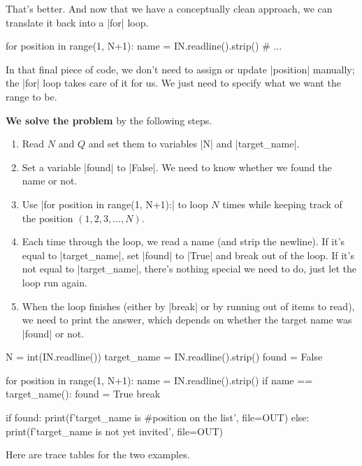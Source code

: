 That's better. And now that we have a conceptually clean approach, we can translate it
back into a \pycode|for| loop.

\begin{pythoncode}
  for position in range(1, N+1):
    name = IN.readline().strip()
    # ...
\end{pythoncode}

In that final piece of code, we don't need to assign or update \pycode|position| manually;
the \pycode|for| loop takes care of it for us. We just need to specify what we want the
range to be.

\textbf{We solve the problem} by the following steps.
\begin{enumerate}
  \item Read $N$ and $Q$ and set them to variables \pycode|N| and \pycode|target_name|.
  \item Set a variable \pycode|found| to \pycode|False|. We need to know whether we found
    the name or not.
  \item Use \pycode|for position in range(1, N+1):| to loop $N$ times while keeping track
    of the position $(1,2,3,\dots,N)$.
  \item Each time through the loop, we read a name (and strip the newline). If it's equal
    to \pycode|target_name|, set \pycode|found| to \pycode|True| and break out of the
    loop. If it's not equal to \pycode|target_name|, there's nothing special we need to
    do, just let the loop run again.
  \item When the loop finishes (either by \pycode|break| or by running out of items to
    read), we need to print the answer, which depends on whether the target name was
    \pycode|found| or not.
\end{enumerate}

\Solution

\begin{pythoncode}
  N = int(IN.readline())
  target_name = IN.readline().strip()
  found = False

  for position in range(1, N+1):
    name = IN.readline().strip()
    if name == target_name():
      found = True
      break

  if found:
    print(f'{target_name} is #{position} on the list', file=OUT)
  else:
    print(f'{target_name} is not yet invited', file=OUT)
\end{pythoncode}

\bigskip
Here are trace tables for the two examples.
\medskip

